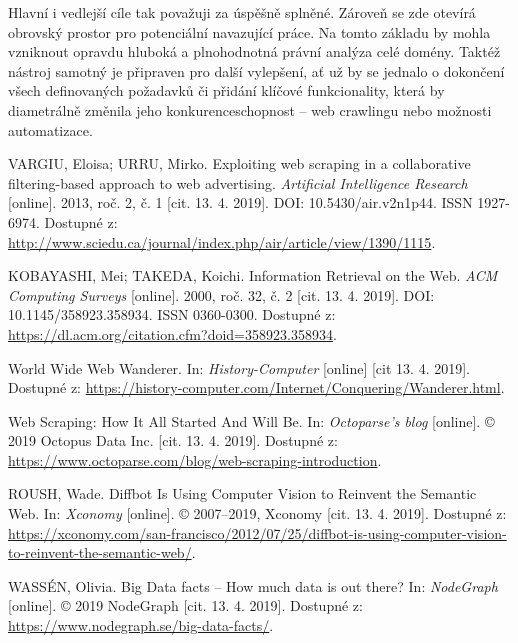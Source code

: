\documentclass[thesis=B,czech]{FITthesis}[2012/06/26]
\begin{document}
\begin{conclusion}
	Hlavní i vedlejší cíle tak považuji za úspěšně splněné. Zároveň se zde otevírá obrovský prostor pro potenciální navazující práce. Na tomto základu by mohla vzniknout opravdu hluboká a plnohodnotná právní analýza celé domény. Taktéž nástroj samotný je připraven pro další vylepšení, ať už by se jednalo o dokončení všech definovaných požadavků či přidání klíčové funkcionality, která by diametrálně změnila jeho konkurenceschopnost -- web crawlingu nebo možnosti automatizace.
\end{conclusion}


\begin{thebibliography}{99}
	VARGIU, Eloisa; URRU, Mirko. Exploiting web scraping in a collaborative filtering-based approach to web advertising. \textit{Artificial Intelligence Research} [online]. 2013, roč. 2, č. 1 [cit. 13. 4. 2019]. DOI: 10.5430/air.v2n1p44. ISSN 1927-6974. Dostupné z: \url{http://www.sciedu.ca/journal/index.php/air/article/view/1390/1115}.
	
	KOBAYASHI, Mei; TAKEDA, Koichi. Information Retrieval on the Web. \textit{ACM Computing Surveys} [online]. 2000, roč. 32, č. 2 [cit. 13. 4. 2019]. DOI: 10.1145/358923.358934. ISSN 0360-0300. Dostupné z: \url{https://dl.acm.org/citation.cfm?doid=358923.358934}.
	
	World Wide Web Wanderer. In: \textit{History-Computer} [online] [cit 13. 4. 2019]. Dostupné z: \url{https://history-computer.com/Internet/Conquering/Wanderer.html}.
	
	Web Scraping: How It All Started And Will Be. In: \textit{Octoparse's blog} [online]. © 2019 Octopus Data Inc. [cit. 13. 4. 2019]. Dostupné z: \url{https://www.octoparse.com/blog/web-scraping-introduction}.
	
	ROUSH, Wade. Diffbot Is Using Computer Vision to Reinvent the Semantic Web. In: \textit{Xconomy} [online]. © 2007--2019, Xconomy [cit. 13. 4. 2019]. Dostupné z: \url{https://xconomy.com/san-francisco/2012/07/25/diffbot-is-using-computer-vision-to-reinvent-the-semantic-web/}.
	
	WASSÉN, Olivia. Big Data facts -- How much data is out there? In: \textit{NodeGraph} [online]. © 2019 NodeGraph [cit. 13. 4. 2019]. Dostupné z: \url{https://www.nodegraph.se/big-data-facts/}.
	

\end{thebibliography}
\end{document}
